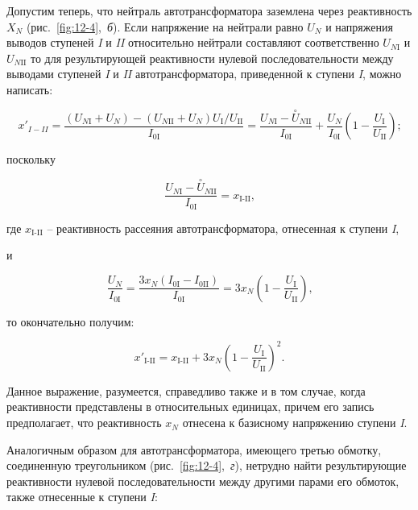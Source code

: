 Допустим теперь, что нейтраль автотрансформатора заземлена через реактивность $ X_N $ (рис.~\ref{fig:12-4},~\textit{б}). Если напряжение на нейтрали равно $ U_N $ и напряжения выводов ступеней \textit{I} и \textit{II} относительно нейтрали составляют соответственно $ U_{N\text{I}} $ и $ U_{N\text{II}} $ то для результирующей реактивности нулевой последовательности между выводами ступеней \textit{I} и \textit{II} автотрансформатора, приведенной к ступени \textit{I}, можно написать:

\begin{equation*}
	x'_{I-II} = \frac{( U_{N\text{I}} + U_N ) - ( U_{N\text{II}} + U_N ) U_{\text{I}} / U_{\text{II}} }{I_{0\text{I}}} = \frac{ U_{N\text{I}} - \overset{\circ }{U}_{N\text{II}} }{ I_{0\text{I}} } + \frac{U_N}{I_{0\text{I}}}\left ( 1- \frac{U_{\text{I}}}{U_{\text{II}}} \right ) \text{;}
\end{equation*}

поскольку

\begin{equation*}
	\frac{ U_{N\text{I}} - \overset{\circ }{U}_{N\text{II}} }{ I_{0\text{I}} } = x_{\text{I-II}} \text{,}
\end{equation*}

где $ x_{\text{I-II}} $ -- реактивность рассеяния автотрансформатора, отнесенная к ступени \textit{I},

и

\begin{equation*}
	\frac{ U_{N} }{ I_{0\text{I}} } = \frac{ 3x_N ( I_{0\text{I}} - I_{0\text{II}} ) }{ I_{0\text{I}} } = 3x_N \left ( 1- \frac{U_{\text{I}}}{U_{\text{II}}} \right ) \text{,}
\end{equation*}

то окончательно получим:

\begin{equation}
	x'_{\text{I-II}} = x_{\text{I-II}} + 3x_N \left ( 1- \frac{U_{\text{I}}}{U_{\text{II}}} \right )^2 \text{.}
	\label{eq:12-8}
\end{equation}

Данное выражение, разумеется, справедливо также и в том случае, когда реактивности представлены в относительных единицах, причем его запись предполагает, что реактивность $ x_N $ отнесена к базисному напряжению ступени \textit{I}.

Аналогичным образом для автотрансформатора, имеющего третью обмотку, соединенную треугольником (рис.~\ref{fig:12-4},~\textit{г}), нетрудно найти результирующие реактивности нулевой последовательности между другими парами его обмоток, также отнесенные к ступени \textit{I}:

